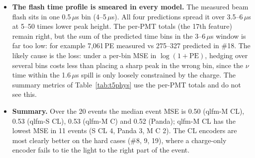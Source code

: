 \begin{itemize}
\begin{itemize}
    \item \#9: a flash at 2--3\,$\mu$s at low $z$. All miss it, but qlfm-M CL less (TV 0.32 vs 0.59--0.60).
  \end{itemize}
  Late light at 10--24\,$\mu$s is also missed (\#2, 12, 18). The charge readout does not fix the arrival time of a cosmic to the microsecond, so which cosmic made a flash at a given time in the 24\,$\mu$s window is not predictable from the charge. Only the beam-window $\nu$ flash has a known time.
  \item \textbf{The flash time profile is smeared in every model.} The measured beam flash sits in one 0.5\,$\mu$s bin (4--5\,$\mu$s). All four predictions spread it over 3.5--6\,$\mu$s at 5--50 times lower peak height. The per-PMT totals (the 17th feature) remain right, but the sum of the predicted time bins in the 3--6\,$\mu$s window is far too low: for example 7{,}061\,PE measured vs 275--327 predicted in \#18. The likely cause is the loss: under a per-bin MSE in $\log(1+\text{PE})$, hedging over several bins costs less than placing a sharp peak in the wrong bin, since the $\nu$ time within the 1.6\,$\mu$s spill is only loosely constrained by the charge. The summary metrics of Table~\ref{tab:t5phys} use the per-PMT totals and do not see this.
  \item \textbf{Summary.} Over the 20 events the median event MSE is 0.50 (qlfm-M CL), 0.53 (qlfm-S CL), 0.53 (qlfm-M C) and 0.52 (Panda); qlfm-M CL has the lowest MSE in 11 events (S CL 4, Panda 3, M C 2). The CL encoders are most clearly better on the hard cases (\#8, 9, 19), where a charge-only encoder fails to tie the light to the right part of the event.
\end{itemize}
